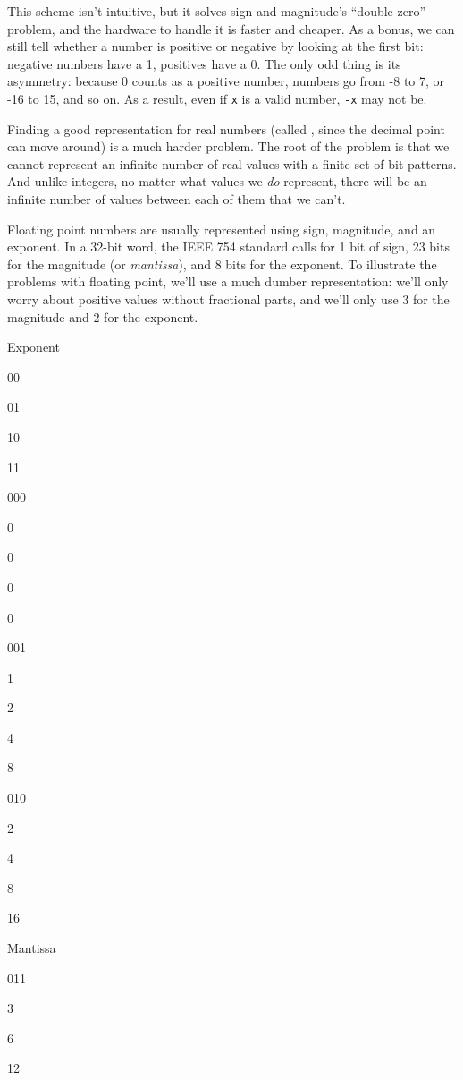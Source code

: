 \documentclass{book}
\begin{document}
This scheme isn't intuitive, but it solves sign and magnitude's ``double
zero'' problem, and the hardware to handle it is faster and cheaper. As
a bonus, we can still tell whether a number is positive or negative by
looking at the first bit: negative numbers have a 1, positives have a 0.
The only odd thing is its asymmetry: because 0 counts as a positive
number, numbers go from -8 to 7, or -16 to 15, and so on. As a result,
even if \texttt{x} is a valid number, \texttt{-x} may not be.

Finding a good representation for real numbers (called
, since the decimal
point can move around) is a much harder problem. The root of the problem
is that we cannot represent an infinite number of real values with a
finite set of bit patterns. And unlike integers, no matter what values
we \emph{do} represent, there will be an infinite number of values
between each of them that we can't.

Floating point numbers are usually represented using sign, magnitude,
and an exponent. In a 32-bit word, the IEEE 754 standard calls for 1 bit
of sign, 23 bits for the magnitude (or \emph{mantissa}), and 8 bits for
the exponent. To illustrate the problems with floating point, we'll use
a much dumber representation: we'll only worry about positive values
without fractional parts, and we'll only use 3 for the magnitude and 2
for the exponent.

Exponent

00

01

10

11

000

0

0

0

0

001

1

2

4

8

010

2

4

8

16

Mantissa

011

3

6

12
\end{document}
